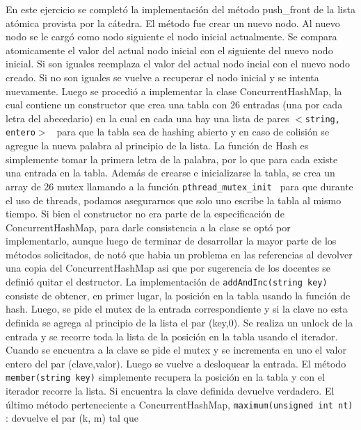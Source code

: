 \documentclass[a4paper]{article}
\begin{document}
{En este ejercicio se completó la implementación del método push_front de la lista atómica provista por la cátedra. El método fue crear un nuevo nodo. Al nuevo nodo se le cargó como nodo siguiente el nodo inicial actualmente. Se compara atomicamente el valor del actual nodo inicial con el siguiente del nuevo nodo inicial. Si son iguales reemplaza el valor del actual nodo incial con el nuevo nodo creado. Si no son iguales se vuelve a recuperar el nodo inicial y se intenta nuevamente. \newline
Luego se procedió a implementar la clase ConcurrentHashMap, la cual contiene un constructor que crea una tabla con 26 entradas (una por cada letra del abecedario) en la cual en cada una hay una lista de pares {\tt $<$string, entero$>$ } para que la tabla sea de hashing abierto y en caso de colisión se agregue la nueva palabra al principio de la lista. La función de Hash es simplemente tomar la primera letra de la palabra, por lo que para cada existe una entrada en la tabla. Además de crearse e inicializarse la tabla, se crea un array de 26 mutex llamando a la función {\tt pthread_mutex_init } para que durante el uso de threads, podamos asegurarnos que solo uno escribe la tabla al mismo tiempo. \newline
Si bien el constructor no era parte de la especificación de ConcurrentHashMap, para darle consistencia a la clase se optó por implementarlo, aunque luego de terminar de desarrollar la mayor parte de los métodos solicitados, de notó que habia un problema en las referencias al devolver una copia del ConcurrentHashMap asi que por sugerencia de los docentes se definió quitar el destructor.
\newline
La implementación de {\tt addAndInc(string key)} consiste de obtener, en primer lugar, la posición en la tabla usando la función de hash. Luego, se pide el mutex de la entrada correspondiente y si la clave no esta definida se agrega al principio de la lista el par (key,0). Se realiza un unlock de la entrada y se recorre toda la lista de la posición en la tabla usando el iterador. Cuando se encuentra a la clave se pide el mutex y se incrementa en uno el valor entero del par (clave,valor). Luego se vuelve a desloquear la entrada.
\newline
El método {\tt member(string key)} simplemente recupera la posición en la tabla y con el iterador recorre la lista. Si encuentra la clave definida devuelve verdadero.
\newline
El último método perteneciente a ConcurrentHashMap, {\tt maximum(unsigned int nt) }: devuelve el par (k, m) tal que
}
\end{document}
